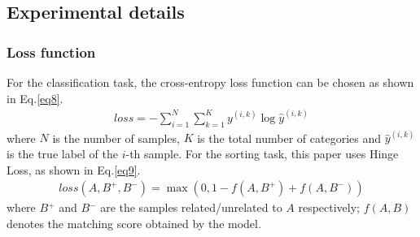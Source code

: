 \documentclass[review]{elsarticle}
\begin{document}
\subsection{Experimental details}
\subsubsection{Loss function}
For the classification task, the cross-entropy loss function can be chosen as shown  in Eq.\ref{eq8}.
\begin{equation}\label{eq8}
\begin{aligned}
   loss=-\sum\limits_{i=1}^{N}{\sum\limits_{k=1}^{K}{{{y}^{(i,k)}}\log {{{\hat{y}}}^{(i,k)}}}}
\end{aligned}
\end{equation}
where $N$ is the number of samples, $K$ is the total number of categories and ${{\hat{y}}^{(i,k)}}$ is the true label of the $i$-th sample. For the sorting task, this paper uses Hinge Loss, as shown in Eq.\ref{eq9}.
\begin{equation}\label{eq9}
\begin{aligned}
   loss(A,{{B}^{+}},{{B}^{-}})=\max (0,1-f(A,{{B}^{+}})+f(A,{{B}^{-}}))
\end{aligned}
\end{equation}
where $B{}^{+}$ and $B{}^{-}$ are the samples related/unrelated to $A$ respectively; $f(A,B)$ denotes the matching score obtained by the model.
\end{document}
